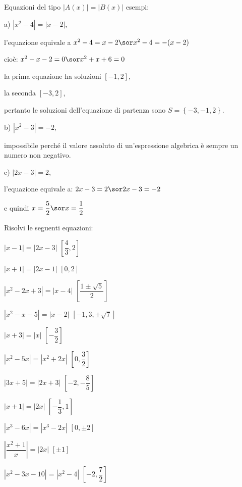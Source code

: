 \begin{esercizio}\label{ese:03.1}
Equazioni del tipo $|A(x)|=|B(x)|$ esempi:
\begin{enumeratea}
\item[a)] $|x^2-4|=|x-2|$, 

l'equazione equivale a \quad $x^2-4=x-2 \sor x^2-4=-(x-2)$

cioè: \quad $x^2-x-2=0 \sor x^2+x+6=0$

la prima equazione ha soluzioni $[-1, 2]$, 

la seconda $[-3, 2]$, 

pertanto le soluzioni dell'equazione di partenza sono 
$S=\left\lbrace -3, -1, 2\right\rbrace $.

\item[b)] $|x^2-3|=-2$, 

impossibile perché il valore assoluto di 
un'espressione algebrica è sempre un numero non negativo.
\item[c)] $|2x-3|=2$, 

l'equazione equivale a: \quad $2x-3=2 \sor 2x-3=-2$

e quindi \quad $x=\dfrac{5}{2} \sor x=\dfrac{1}{2}$
\end{enumeratea}

\noindent Risolvi le seguenti equazioni:

\begin{multicols}{2}
\begin{enumeratea}
\item $\left| x-1\right| =\left| 2x-3\right| $ \hfill $\left[ \dfrac{4}{3}, 
2\right] $
\item $\left| x+1\right| =\left| 2x-1\right| $ \hfill $\left[ 0, 2\right] $
\item $\left| x^2-2x+3 \right| =\left| x-4 \right| $ \hfill $\left[ 
\dfrac{1\pm\sqrt{5}}{2}\right] $
\item $\left| x^2-x-5\right| =\left| x-2\right| $ \hfill $\left[ -1, 3, \pm 
\sqrt{7}\right] $
\item $\left| x+3\right| =\left| x\right| $ \hfill $\left[ -\dfrac{3}{2} 
\right] 
$
\item $\left| x^2-5x \right| =\left| x^2+2x \right| $ \hfill $\left[ 0, 
\dfrac{3}{2} \right] $
\item $\left| 3x+5\right| =\left| 2x+3\right| $ \hfill $\left[-2, 
-\dfrac{8}{5} 
\right] $
\item $\left| x+1\right| =\left| 2x\right| $ \hfill $\left[ -\dfrac{1}{3}, 
1 
\right] $
\item $\left| x^3-6x\right| =\left| x^3-2x\right| $ \hfill $\left[ 0, \pm 2 
\right] $
\item $\left|\dfrac{x^2+1}{x}\right| =\left| 2x\right| $ \hfill $\left[ \pm 
1 
\right] $
\item $\left| x^2-3x-10\right| =\left| x^2-4\right| $ \hfill $\left[-2, 
\dfrac{7}{2} \right] $
\end{enumeratea}
\end{multicols}
\end{esercizio}

